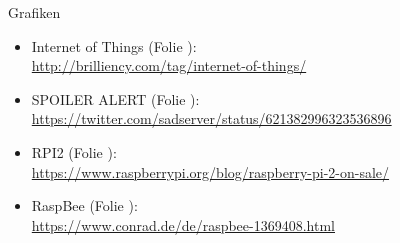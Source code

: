 \documentclass[10pt, compress]{beamer}
\begin{document}
\begin{frame}{Grafiken}
  \small
  \begin{itemize}
    \item Internet of Things (Folie \pageref{fig:iot}):\\
      \footnotesize{
        \url{http://brilliency.com/tag/internet-of-things/}
      }
    \item SPOILER ALERT (Folie \pageref{fig:spoiler}):\\
      \footnotesize{
        \url{https://twitter.com/sadserver/status/621382996323536896}
      }
    \item RPI2 (Folie \pageref{fig:rpi}):\\
      \footnotesize{
        \url{https://www.raspberrypi.org/blog/raspberry-pi-2-on-sale/}
      }
    \item RaspBee (Folie \pageref{fig:rbee}):\\
      \footnotesize{
        \url{https://www.conrad.de/de/raspbee-1369408.html}
      }
  \end{itemize}
  
\end{frame}
\end{document}
